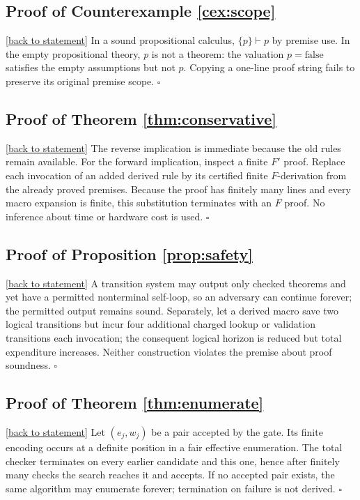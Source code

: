\documentclass[11pt,letterpaper]{article}
\theoremstyle{definition}
\theoremstyle{remark}
\newcommand{\backlink}[1]{\hyperlink{claim:#1}{\footnotesize[back to statement]}}
\begin{document}
\hypertarget{proof:scope}{}\subsection*{Proof of Counterexample \ref{cex:scope}}\backlink{scope}
In a sound propositional calculus, $\{p\}\vdash p$ by premise use. In the empty propositional theory, $p$ is not a theorem: the valuation $p=\mathrm{false}$ satisfies the empty assumptions but not $p$. Copying a one-line proof string fails to preserve its original premise scope. $\square$

\hypertarget{proof:conservative}{}\subsection*{Proof of Theorem \ref{thm:conservative}}\backlink{conservative}
The reverse implication is immediate because the old rules remain available. For the forward implication, inspect a finite $F'$ proof. Replace each invocation of an added derived rule by its certified finite $F$-derivation from the already proved premises. Because the proof has finitely many lines and every macro expansion is finite, this substitution terminates with an $F$ proof. No inference about time or hardware cost is used. $\square$

\hypertarget{proof:safety}{}\subsection*{Proof of Proposition \ref{prop:safety}}\backlink{safety}
A transition system may output only checked theorems and yet have a permitted nonterminal self-loop, so an adversary can continue forever; the permitted output remains sound. Separately, let a derived macro save two logical transitions but incur four additional charged lookup or validation transitions each invocation; the consequent logical horizon is reduced but total expenditure increases. Neither construction violates the premise about proof soundness. $\square$

\hypertarget{proof:enumerate}{}\subsection*{Proof of Theorem \ref{thm:enumerate}}\backlink{enumerate}
Let $(e_j,w_j)$ be a pair accepted by the gate. Its finite encoding occurs at a definite position in a fair effective enumeration. The total checker terminates on every earlier candidate and this one, hence after finitely many checks the search reaches it and accepts. If no accepted pair exists, the same algorithm may enumerate forever; termination on failure is not derived. $\square$
\end{document}
